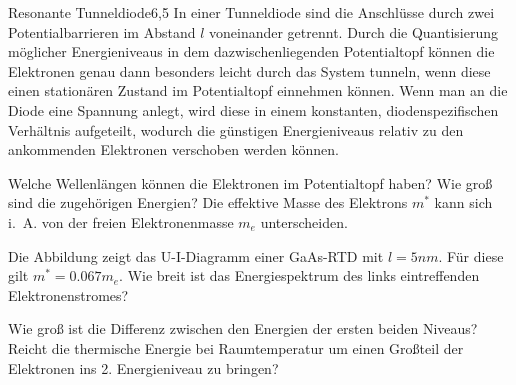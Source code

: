 \begin{problem}{Resonante Tunneldiode}{6,5}
In einer Tunneldiode sind die Anschlüsse durch zwei Potentialbarrieren im Abstand $l$ voneinander getrennt. Durch die Quantisierung möglicher Energieniveaus in dem dazwischenliegenden Potentialtopf können die Elektronen genau dann besonders leicht durch das System tunneln, wenn diese einen stationären Zustand im Potentialtopf einnehmen können. Wenn man an die Diode eine Spannung anlegt, wird diese in einem konstanten, diodenspezifischen Verhältnis aufgeteilt, wodurch die günstigen Energieniveaus relativ zu den ankommenden Elektronen verschoben werden können.
\begin{abcenum}
\item Welche Wellenlängen können die Elektronen im Potentialtopf haben? Wie groß sind die zugehörigen Energien? \hinweis Die effektive Masse des Elektrons $m^*$ kann sich i.\ A. von der freien Elektronenmasse $m_e$ unterscheiden.
\item Die Abbildung zeigt das U-I-Diagramm einer GaAs-RTD mit $l=5 \unit{nm}$. Für diese gilt $m^* = 0.067 m_e$. Wie breit ist das Energiespektrum des links eintreffenden Elektronenstromes?
\item Wie groß ist die Differenz zwischen den Energien der ersten beiden Niveaus? Reicht die thermische Energie bei Raumtemperatur um einen Großteil der Elektronen ins 2. Energieniveau zu bringen?
\end{abcenum}


\end{problem}
